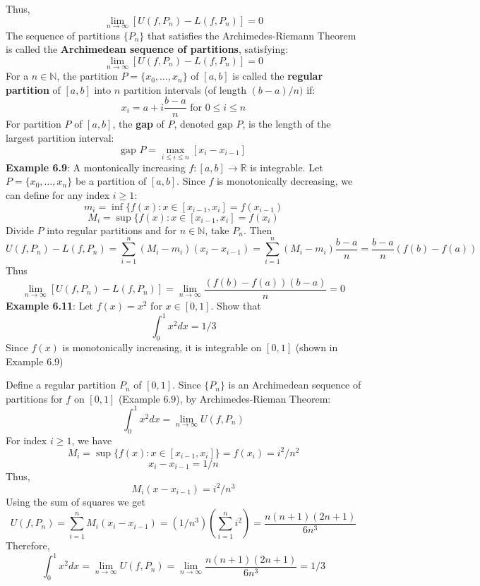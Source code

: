 \documentclass{article}
\begin{document}
  Thus,
  \[\lim_{n \rightarrow \infty}[U(f, P_n) - L(f, P_n)] = 0\]
  The sequence of partitions $\{P_n\}$ that satisfies the Archimedes-Riemann Theorem is called the \textbf{Archimedean sequence of partitions}, satisfying:
  \[\lim_{n \rightarrow \infty}[U(f, P_n) - L(f,P_n)] = 0\]
  For a $n \in \mathbb{N}$, the partition $P = \{x_0, \ldots, x_n\}$ of $[a, b]$ is called the \textbf{regular partition} of $[a,b]$ into $n$ partition intervals (of length $(b-a)/n)$ if:
  \[x_i = a + i\frac{b - a}{n} \text { for } 0 \leq i \leq n\]
  For partition $P$ of $[a,b]$, the \textbf{gap} of $P$, denoted $\text{gap }P$, is the length of the largest partition interval:
  \[\text{gap }P = \max_{i \leq i \leq n}[x_i - x_{i-1}]\]
  \textbf{Example 6.9}: A montonically increasing $f \colon [a, b] \rightarrow \mathbb{R}$ is integrable. Let $P = \{x_0, \ldots, x_n\}$ be a partition of $[a, b]$. Since $f$ is monotonically decreasing, we can define for any index $i \geq 1$:
  \[m_i = \inf\{f(x) \colon x \in [x_{i-1}, x_i] = f(x_{i-1})\]
  \[M_i = \sup\{f(x) \colon x \in [x_{i-1}, x_i] = f(x_{i})\]
    Divide $P$ into regular partitions and for $n \in \mathbb{N}$, take $P_n$. Then
    \[U(f,P_n) - L(f, P_n) = \sum_{i = 1}^{n}(M_i - m_i)(x_i - x_{i-1}) = \sum_{i = 1}^{n}(M_i - m_i)\frac{b-a}{n} =\frac{b-a}{n}(f(b) - f(a))\]
    Thus
    \[\lim_{n \rightarrow \infty}[U(f, P_n) - L(f, P_n)] = \lim_{n \rightarrow \infty}\frac{(f(b) - f(a))(b-a)}{n} = 0\]
    \textbf{Example 6.11}: Let $f(x) = x^2$ for $x \in [0, 1]$. Show that
    \[\int_{0}^{1}x^2dx = 1/3\]
    Since $f(x)$ is monotonically increasing, it is integrable on $[0, 1]$ (shown in Example 6.9)

    Define a regular partition $P_n$ of $[0,1]$. Since $\{P_n\}$ is an Archimedean sequence of partitions for $f$ on $[0,1]$ (Example 6.9), by Archimedes-Rieman Theorem:
    \[\int_{0}^{1}x^2dx = \lim_{n \rightarrow \infty}U(f, P_n)\]
    For index $i \geq 1$, we have
    \[M_i = \sup\{f(x) \colon x \in [x_{i-1}, x_i]\} = f(x_i) = i^2/n^2\]
    \[x_i - x_{i-1} = 1/n\]
    Thus,
    \[M_i(x - x_{i-1}) = i^2/n^3\]
    Using the sum of squares we get
    \[U(f, P_n) = \sum_{i = 1}^{n}M_i(x_i - x_{i-1}) = (1/n^3)\left(\sum_{i=1}^{n}i^2\right) = \frac{n(n+1)(2n+1)}{6n^3}\]
    Therefore,
    \[\int_{0}^1x^2dx = \lim_{n \rightarrow \infty}U(f, P_n) = \lim_{n \rightarrow \infty}\frac{n(n+1)(2n+1)}{6n^3} = 1/3\]
\end{document}
